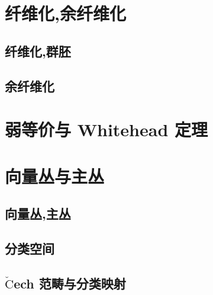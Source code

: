 \section{纤维化,余纤维化}
\subsection{纤维化,群胚}
\subsection{余纤维化}
\section{弱等价与 Whitehead 定理}
\section{向量丛与主丛}
\subsection{向量丛,主丛}
\subsection{分类空间}
\subsection{$\check{\text{C}}$ech 范畴与分类映射}
